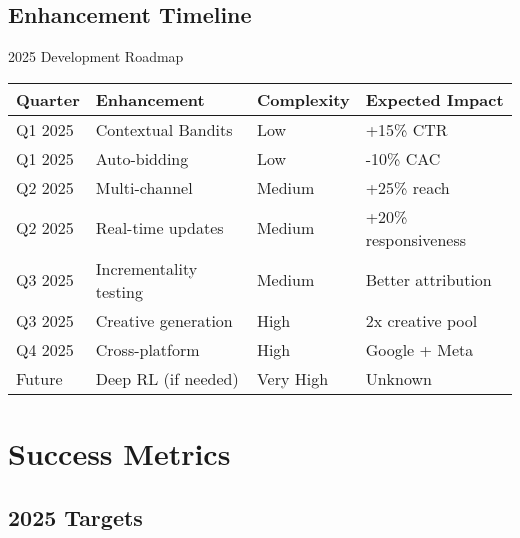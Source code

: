 \documentclass[11pt,a4paper]{report}
\begin{document}
\subsection{Enhancement Timeline}

\begin{techbox}{2025 Development Roadmap}
\begin{tabular}{|l|l|l|l|}
\hline
\rowcolor{aelpblue!20}
\textbf{Quarter} & \textbf{Enhancement} & \textbf{Complexity} & \textbf{Expected Impact} \\
\hline
Q1 2025 & Contextual Bandits & Low & +15\% CTR \\
Q1 2025 & Auto-bidding & Low & -10\% CAC \\
Q2 2025 & Multi-channel & Medium & +25\% reach \\
Q2 2025 & Real-time updates & Medium & +20\% responsiveness \\
Q3 2025 & Incrementality testing & Medium & Better attribution \\
Q3 2025 & Creative generation & High & 2x creative pool \\
Q4 2025 & Cross-platform & High & Google + Meta \\
Future & Deep RL (if needed) & Very High & Unknown \\
\hline
\end{tabular}
\end{techbox}

\section{Success Metrics}

\subsection{2025 Targets}
\end{document}
